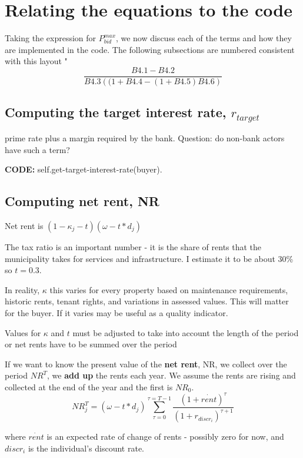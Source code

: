 \section{Relating the equations to the code}
Taking the expression for $P^{max}_{bid}$, we now discuss each of the terms and how they are implemented in the code. The following subsections are numbered consistent with this layout "
\[\frac{B4.1-B4.2}{B4.3\left( (1+B4.4 - (1+B4.5)B4.6\right)}\]

\subsection{Computing the target interest rate, $r_{target}$}
prime rate plus a margin required by the bank.  Question: do non-bank actors have such a term?

\textbf{CODE:}   self.get-target-interest-rate(buyer).


\subsection{Computing net rent, NR}
Net rent is $(1-\kappa_j - t) (\omega-t*d_j)$


The tax ratio is an important number - it is the share of rents that the municipality takes for services and infrastructure. I estimate it to be about 30\% so $t=0.3$.


In reality, $\kappa$ this varies for every property based on maintenance requirements, historic rents, tenant rights, and variations in assessed values. This will matter for the buyer. If it varies may be useful as a quality indicator.

Values for $\kappa$ and $t$ must be adjusted to take into account the length of the period or net rents have to be summed over the period


If we want to know the  present value  of the \textbf{net rent}, NR, we collect over the period  $NR^T$, we \textbf{add up} the rents each year. We  assume the rents are rising and  collected at the end of the year and the first is $NR_0$.
\[NR_j^T= (\omega-t*d_j)\sum_{\tau=0}^{\tau=T-1} \frac{(1+\dot{rent})^{\tau}} {(1+r_{discr_i})^{\tau+1}} \]

where $\dot{rent}$ is an expected rate of change of rents - possibly zero for now, and $discr_i$ is the individual's discount rate.



